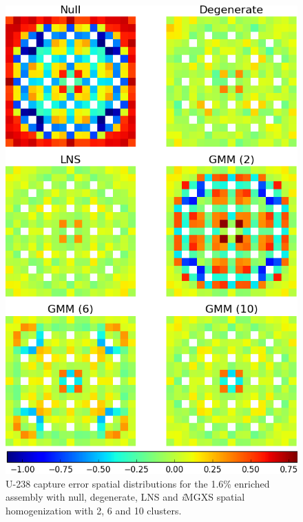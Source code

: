 \begin{figure}[h!]
\centering
\includegraphics[width=0.9\linewidth]{figures/results/spatial/assm-16/capt-err}
\vspace{2mm}
\caption[U-238 capture errors for the 1.6\% enriched assembly]{U-238 capture error spatial distributions for the 1.6\% enriched assembly with null, degenerate, \ac{LNS} and \textit{i}\ac{MGXS} spatial homogenization with 2, 6 and 10 clusters.}
\label{fig:chap11-assm-1.6-capt-err}
\end{figure}

\clearpage

